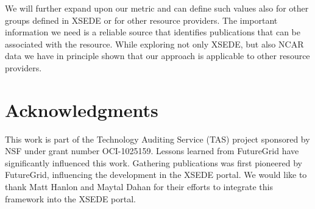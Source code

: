 \documentclass{sig-alternate}
\begin{document}
We will further expand upon our metric and can define such values also for other groups defined in XSEDE or for other resource providers. The important information we need is a reliable source that identifies publications that can be associated with the resource. While exploring not only XSEDE, but also NCAR data we have in principle shown that our approach is applicable to other resource providers.






\section{Acknowledgments}

 
This work is part of the Technology Auditing Service (TAS) project sponsored by NSF under grant number OCI-1025159. Lessons learned from FutureGrid have significantly influenced this work. Gathering publications was first pioneered by FutureGrid, influencing the development in the XSEDE portal. We would like to thank Matt Hanlon and Maytal Dahan for their efforts to integrate this framework into the XSEDE portal. 
\end{document}
